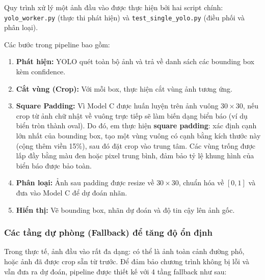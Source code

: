\documentclass[12pt,a4paper]{article}
\begin{document}
Quy trình xử lý một ảnh đầu vào được thực hiện bởi hai script chính: \texttt{yolo\_worker.py} (thực thi phát hiện) và \texttt{test\_single\_yolo.py} (điều phối và phân loại).

Các bước trong pipeline bao gồm:

\begin{enumerate}
    \item \textbf{Phát hiện:} YOLO quét toàn bộ ảnh và trả về danh sách các bounding box kèm confidence.
    \item \textbf{Cắt vùng (Crop):} Với mỗi box, thực hiện cắt vùng ảnh tương ứng.
    \item \textbf{Square Padding:} Vì Model C được huấn luyện trên ảnh vuông $30 \times 30$, nếu crop từ ảnh chữ nhật về vuông trực tiếp sẽ làm biến dạng biển báo (ví dụ biển tròn thành oval). Do đó, em thực hiện \textbf{square padding}: xác định cạnh lớn nhất của bounding box, tạo một vùng vuông có cạnh bằng kích thước này (cộng thêm viền 15\%), sau đó đặt crop vào trung tâm. Các vùng trống được lấp đầy bằng màu đen hoặc pixel trung bình, đảm bảo tỷ lệ khung hình của biển báo được bảo toàn.
    \item \textbf{Phân loại:} Ảnh sau padding được resize về $30 \times 30$, chuẩn hóa về $[0,1]$ và đưa vào Model C để dự đoán nhãn.
    \item \textbf{Hiển thị:} Vẽ bounding box, nhãn dự đoán và độ tin cậy lên ảnh gốc.
\end{enumerate}

\subsubsection*{Các tầng dự phòng (Fallback) để tăng độ ổn định}

Trong thực tế, ảnh đầu vào rất đa dạng: có thể là ảnh toàn cảnh đường phố, hoặc ảnh đã được crop sẵn từ trước. Để đảm bảo chương trình không bị lỗi và vẫn đưa ra dự đoán, pipeline được thiết kế với 4 tầng fallback như sau:
\end{document}

